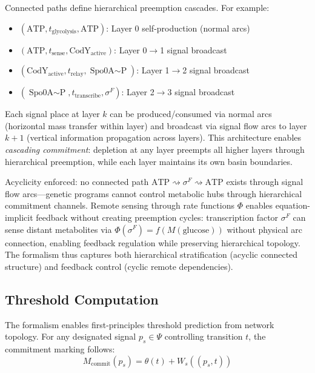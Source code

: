 \documentclass[10pt,letterpaper]{article}
\begin{document}
\vspace{3pt}
\noindent Connected paths define hierarchical preemption cascades. For example:
\begin{itemize}
\item $(\text{ATP}, t_{\text{glycolysis}}, \text{ATP})$: Layer 0 self-production (normal arcs)
\item $(\text{ATP}, t_{\text{sense}}, \text{CodY}_{\text{active}})$: Layer 0$\rightarrow$1 signal broadcast
\item $(\text{CodY}_{\text{active}}, t_{\text{relay}}, \text{Spo0A$\sim$P})$: Layer 1$\rightarrow$2 signal broadcast
\item $(\text{Spo0A$\sim$P}, t_{\text{transcribe}}, \sigma^F)$: Layer 2$\rightarrow$3 signal broadcast
\end{itemize}
Each signal place at layer $k$ can be produced/consumed via normal arcs (horizontal mass transfer within layer) and broadcast via signal flow arcs to layer $k+1$ (vertical information propagation across layers). This architecture enables \textit{cascading commitment}: depletion at any layer preempts all higher layers through hierarchical preemption, while each layer maintains its own basin boundaries.

Acyclicity enforced: no connected path $\text{ATP} \rightsquigarrow \sigma^F \rightsquigarrow \text{ATP}$ exists through signal flow arcs---genetic programs cannot control metabolic hubs through hierarchical commitment channels. Remote sensing through rate functions $\Phi$ enables equation-implicit feedback without creating preemption cycles: transcription factor $\sigma^F$ can sense distant metabolites via $\Phi(\sigma^F) = f(M(\text{glucose}))$ without physical arc connection, enabling feedback regulation while preserving hierarchical topology. The formalism thus captures both hierarchical stratification (acyclic connected structure) and feedback control (cyclic remote dependencies).

\subsection{Threshold Computation}

The formalism enables first-principles threshold prediction from network topology. For any designated signal $p_s \in \Psi$ controlling transition $t$, the commitment marking follows:
\begin{equation}
M_{\text{commit}}(p_s) = \theta(t) + W_s((p_s,t))
\end{equation}
\end{document}
